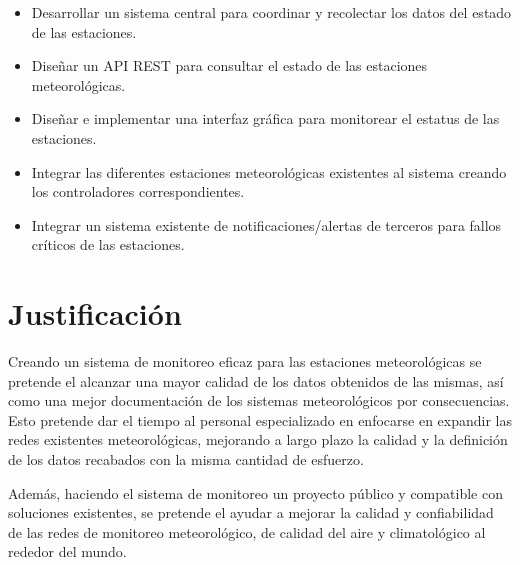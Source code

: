 \begin{itemize}

   \item Desarrollar un sistema central para coordinar y recolectar los datos del estado de las estaciones.

   \item Diseñar un API REST para consultar el estado de las estaciones meteorológicas.


   \item Diseñar e implementar una interfaz gráfica para monitorear el estatus de las estaciones.

   \item Integrar las diferentes estaciones meteorológicas existentes al sistema creando los controladores correspondientes.

   \item Integrar un sistema existente de notificaciones/alertas de terceros para fallos críticos de las estaciones.
\end{itemize}

\section{Justificación}

Creando un sistema de monitoreo eficaz para las estaciones meteorológicas se pretende el alcanzar una mayor calidad de los datos obtenidos de las mismas, así como una mejor documentación de los sistemas meteorológicos por consecuencias. Esto pretende dar el tiempo al personal especializado en enfocarse en expandir las redes existentes meteorológicas, mejorando a largo plazo la calidad y la definición de los datos recabados con la misma cantidad de esfuerzo.


Además, haciendo el sistema de monitoreo un proyecto público y compatible con soluciones existentes, se pretende el ayudar a mejorar la calidad y confiabilidad de las redes de monitoreo meteorológico, de calidad del aire y climatológico al rededor del mundo.


